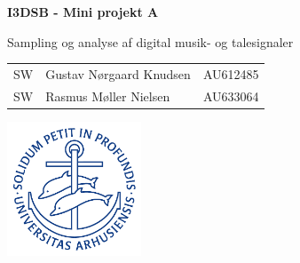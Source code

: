 \documentclass{article}
\begin{document}

\begin{titlepage}
  \begin{center}
    
    \vspace*{1cm}
    \Huge
    \textbf{I3DSB - Mini projekt A}

    \vspace{0.5cm}
    \huge
    Sampling og analyse af digital musik- og talesignaler \\
    \date\today

    \vfill

    \Large
    \begin{tabular}{llr}
      SW & Gustav Nørgaard Knudsen & AU612485 \\
      SW & Rasmus Møller Nielsen & AU633064\\
    \end{tabular}
    
    \vfill
    \includegraphics[width=0.3\textwidth]{au2}
    \vspace{2cm}

  \end{center}
\end{titlepage}

\newpage
\newpage

\setcounter{page}{1}

\end{document}
